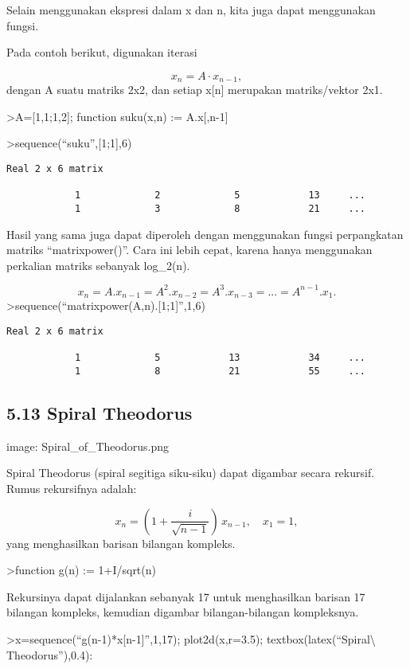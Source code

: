 \documentclass[
]{book}
\begin{document}
Selain menggunakan ekspresi dalam x dan n, kita juga dapat menggunakan fungsi.

Pada contoh berikut, digunakan iterasi

\[x_n =A \cdot x_{n-1},\]dengan A suatu matriks 2x2, dan setiap x{[}n{]} merupakan matriks/vektor 2x1.

\textgreater A={[}1,1;1,2{]}; function suku(x,n) := A.x{[},n-1{]}

\textgreater sequence(``suku'',{[}1;1{]},6)

\begin{verbatim}
Real 2 x 6 matrix

            1             2             5            13     ...
            1             3             8            21     ...
\end{verbatim}

Hasil yang sama juga dapat diperoleh dengan menggunakan fungsi perpangkatan matriks ``matrixpower()''. Cara ini lebih cepat, karena hanya menggunakan perkalian matriks sebanyak log\_2(n).

\[x_n=A.x_{n-1}=A^2.x_{n-2}=A^3.x_{n-3}= ... = A^{n-1}.x_1.\]\textgreater sequence(``matrixpower(A,n).{[}1;1{]}'',1,6)

\begin{verbatim}
Real 2 x 6 matrix

            1             5            13            34     ...
            1             8            21            55     ...
\end{verbatim}

\subsection{5.13 Spiral Theodorus}\label{spiral-theodorus}

image: Spiral\_of\_Theodorus.png

Spiral Theodorus (spiral segitiga siku-siku) dapat digambar secara rekursif. Rumus rekursifnya adalah:

\[x_n = \left( 1 + \frac{i}{\sqrt{n-1}} \right) \, x_{n-1}, \quad x_1=1,\]yang menghasilkan barisan bilangan kompleks.

\textgreater function g(n) := 1+I/sqrt(n)

Rekursinya dapat dijalankan sebanyak 17 untuk menghasilkan barisan 17 bilangan kompleks, kemudian digambar bilangan-bilangan kompleksnya.

\textgreater x=sequence(``g(n-1)*x{[}n-1{]}'',1,17); plot2d(x,r=3.5); textbox(latex(``Spiral\textbackslash{} Theodorus''),0.4):
\end{document}
